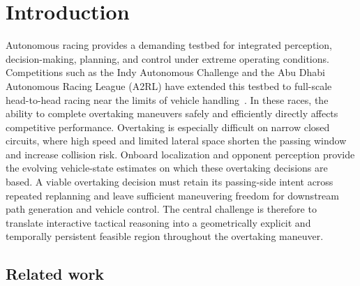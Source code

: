 \documentclass[journal,twoside,web]{ieeecolor}
\begin{document}
\maketitle

\section{Introduction}
Autonomous racing provides a demanding testbed for integrated perception, decision-making, planning, and control under extreme operating conditions. Competitions such as the Indy Autonomous Challenge and the Abu Dhabi Autonomous Racing League (A2RL) have extended this testbed to full-scale head-to-head racing near the limits of vehicle handling~\cite{betz2022survey,hoffmann2026a2rl}. In these races, the ability to complete overtaking maneuvers safely and efficiently directly affects competitive performance. Overtaking is especially difficult on narrow closed circuits, where high speed and limited lateral space shorten the passing window and increase collision risk. Onboard localization and opponent perception provide the evolving vehicle-state estimates on which these overtaking decisions are based. A viable overtaking decision must retain its passing-side intent across repeated replanning and leave sufficient maneuvering freedom for downstream path generation and vehicle control. The central challenge is therefore to translate interactive tactical reasoning into a geometrically explicit and temporally persistent feasible region throughout the overtaking maneuver.


\subsection{Related work}
\end{document}
